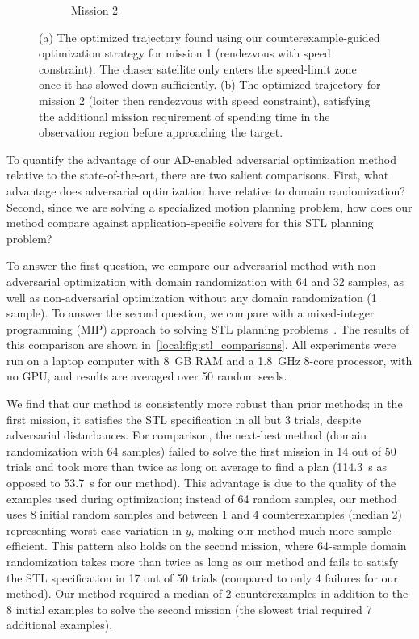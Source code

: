 \begin{figure}[t]
\begin{subfigure}[t]{0.4\linewidth}
        \caption{Mission 2}
    \end{subfigure}%
    \caption{(a) The optimized trajectory found using our counterexample-guided optimization strategy for mission 1 (rendezvous with speed constraint). The chaser satellite only enters the speed-limit zone once it has slowed down sufficiently. (b) The optimized trajectory for mission 2 (loiter then rendezvous with speed constraint), satisfying the additional mission requirement of spending time in the observation region before approaching the target.}
    \label{local:fig:mission_trajs}
\end{figure}

To quantify the advantage of our AD-enabled adversarial optimization method relative to the state-of-the-art, there are two salient comparisons. First, what advantage does adversarial optimization have relative to domain randomization? Second, since we are solving a specialized motion planning problem, how does our method compare against application-specific solvers for this STL planning problem?

To answer the first question, we compare our adversarial method with non-adversarial optimization with domain randomization with 64 and 32 samples, as well as non-adversarial optimization without any domain randomization (1 sample). To answer the second question, we compare with a mixed-integer programming (MIP) approach to solving STL planning problems~\cite{sunMultiagentMotionPlanning2022}. The results of this comparison are shown in~\ref{local:fig:stl_comparisons}. All experiments were run on a laptop computer with \SI{8}{GB} RAM and a \SI{1.8}{GHz} 8-core processor, with no GPU, and results are averaged over 50 random seeds.

We find that our method is consistently more robust than prior methods; in the first mission, it satisfies the STL specification in all but 3 trials, despite adversarial disturbances. For comparison, the next-best method (domain randomization with 64 samples) failed to solve the first mission in 14 out of 50 trials and took more than twice as long on average to find a plan (\SI{114.3}{s} as opposed to \SI{53.7}{s} for our method). This advantage is due to the quality of the examples used during optimization; instead of 64 random samples, our method uses 8 initial random samples and between 1 and 4 counterexamples (median 2) representing worst-case variation in $y$, making our method much more sample-efficient. This pattern also holds on the second mission, where 64-sample domain randomization takes more than twice as long as our method and fails to satisfy the STL specification in 17 out of 50 trials (compared to only 4 failures for our method). Our method required a median of 2 counterexamples in addition to the 8 initial examples to solve the second mission (the slowest trial required 7 additional examples).

